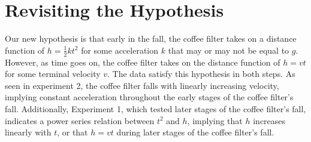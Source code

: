 \documentclass[8pt]{extarticle}
\begin{document}
{\section*{Revisiting the Hypothesis}
Our new hypothesis is that early in the fall, the coffee filter takes on a distance function of $h = \frac{1}{2}kt^2$ for some acceleration $k$ that may or may not be equal to $g$. However, as time goes on, the coffee filter takes on the distance function of $h = vt$ for some terminal velocity $v$. \newline
\newline
The data satisfy this hypothesis in both steps. As seen in experiment 2, the coffee filter falls with linearly increasing velocity, implying constant acceleration throughout the early stages of the coffee filter's fall. Additionally, Experiment 1, which tested later stages of the coffee filter's fall, indicates a power series relation between $t^2$ and $h$, implying that $h$ increases linearly with $t$, or that $h = vt$ during later stages of the coffee filter's fall.
}
\end{document}
